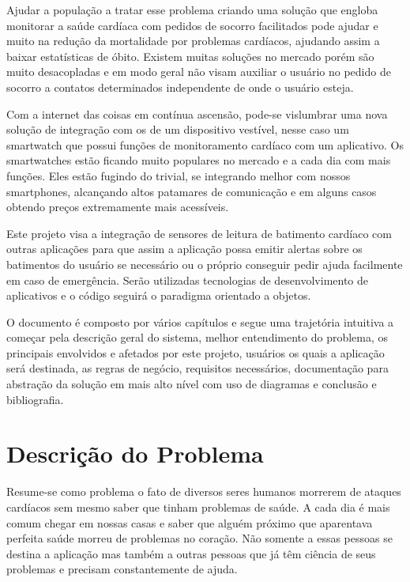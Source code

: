\documentclass[
	12pt,				%
	openright,			%
	oneside,			%
	a4paper,			%
	english,			%
	french,				%
	spanish,			%
	brazil				%
]{abntex2}
\begin{document}
Ajudar a população a tratar esse problema criando uma solução que engloba monitorar a saúde cardíaca com pedidos de socorro facilitados pode ajudar e muito na redução da mortalidade por problemas cardíacos, ajudando assim a baixar estatísticas de óbito. Existem muitas soluções no mercado porém são muito desacopladas e em modo geral não visam auxiliar o usuário no pedido de socorro a contatos determinados independente de onde o usuário esteja.

Com a internet das coisas em contínua ascensão, pode-se vislumbrar uma nova solução de integração com os de um dispositivo vestível, nesse caso um smartwatch que possui funções de monitoramento cardíaco com um aplicativo. Os smartwatches estão ficando muito populares no mercado e a cada dia com mais funções. Eles estão fugindo do trivial, se integrando melhor com nossos smartphones, alcançando altos patamares de comunicação e em alguns casos obtendo preços extremamente mais acessíveis.

Este projeto visa a integração de sensores de leitura de batimento cardíaco com outras aplicações para que assim a aplicação possa emitir alertas sobre os batimentos do usuário se necessário ou o próprio conseguir pedir ajuda facilmente em caso de emergência. Serão utilizadas tecnologias de desenvolvimento de aplicativos e o código seguirá o paradigma orientado a objetos.

O documento é composto por vários capítulos e segue uma trajetória intuitiva a começar pela descrição geral do sistema, melhor entendimento do problema, os principais envolvidos e afetados por este projeto, usuários os quais a aplicação será destinada, as regras de negócio, requisitos necessários, documentação para abstração da solução em mais alto nível com uso de diagramas e conclusão e bibliografia.

\chapter{Descrição do Problema}

Resume-se como problema o fato de diversos seres humanos morrerem de ataques cardíacos sem mesmo saber que tinham problemas de saúde. A cada dia é mais comum chegar em nossas casas e saber que alguém próximo que aparentava perfeita saúde morreu de problemas no coração. Não somente a essas pessoas se destina a aplicação mas também a outras pessoas que já têm ciência de seus problemas e precisam constantemente de ajuda.
\end{document}
